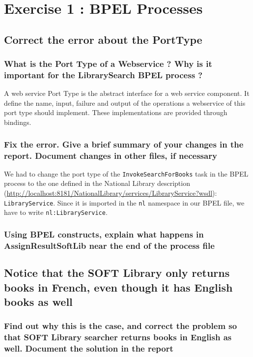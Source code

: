 \section{Exercise 1 : BPEL Processes}

\subsection{Correct the error about the PortType}
    \subsubsection{What is the Port Type of a Webservice ? Why is it important for the LibrarySearch BPEL process ?}
    A web service Port Type is the abstract interface for a web service component. It define the name, input, failure and output of the operations a webservice of this port type should implement. These implementations are provided through bindings.

    \subsubsection{Fix the error. Give a brief summary of your changes in the report. Document changes in other files, if necessary}

    We had to change the port type of the \texttt{InvokeSearchForBooks} task in the BPEL process to the one defined in the National Library description (\url{http://localhost:8181/NationalLibrary/services/LibraryService?wsdl}): \texttt{LibraryService}. Since it is imported in the \texttt{nl} namespace in our BPEL file, we have to write \texttt{nl:LibraryService}.

    \subsubsection{Using BPEL constructs, explain what happens in AssignResultSoftLib near the end of the process file}

\subsection{Notice that the SOFT Library only returns books in French, even though it has English books as well}

    \subsubsection{Find out why this is the case, and correct the problem so that SOFT Library searcher returns books in English as well. Document the solution in the
    report}

